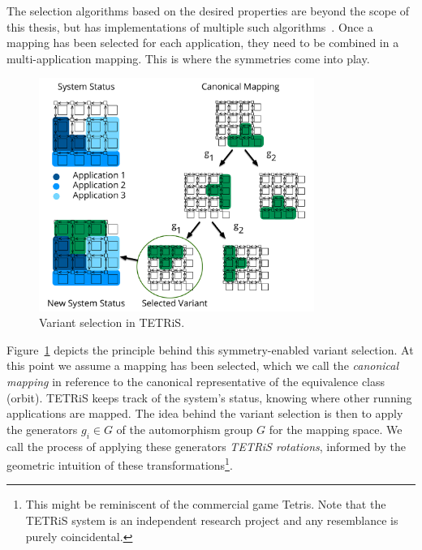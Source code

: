 The selection algorithms based on the desired properties are beyond the scope of this thesis, but \mocasin has implementations of multiple such algorithms~\cite{khasanov_date20}.
Once a mapping has been selected for each application, they need to be combined in a multi-application mapping.
This is where the symmetries come into play. 

\begin{figure}[th]
	\centering
	\includegraphics[width=0.8\textwidth]{figures/Variant_Selection.pdf}
	\caption{Variant selection in \ac{TETRiS}.}
	\label{fig:tetris_variant_selection}
\end{figure}

Figure~\ref{fig:tetris_variant_selection} depicts the principle behind this symmetry-enabled variant selection.
At this point we assume a mapping has been selected, which we call the \emph{canonical mapping} in reference to the canonical representative of the equivalence class (orbit).
\ac{TETRiS} keeps track of the system's status, knowing where other running applications are mapped.
The idea behind the variant selection is then to apply the generators $g_i \in G$ of the automorphism group $G$ for the mapping space. 
We call the process of applying these generators \emph{\ac{TETRiS} rotations}, informed by the geometric intuition of these transformations\footnote{This might be reminiscent of the commercial game Tetris. Note that the \ac{TETRiS} system is an independent research project and any resemblance is purely coincidental.}.


